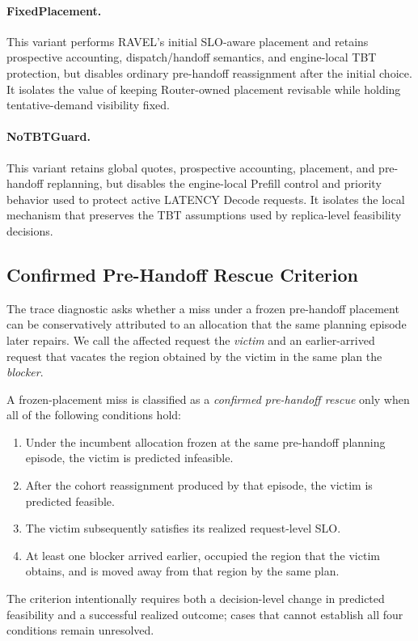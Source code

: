 \paragraph{FixedPlacement.}
This variant performs RAVEL's initial SLO-aware placement and retains
prospective accounting, dispatch/handoff semantics, and engine-local TBT
protection, but disables ordinary pre-handoff reassignment after the initial
choice.
It isolates the value of keeping Router-owned placement revisable while holding
tentative-demand visibility fixed.

\paragraph{NoTBTGuard.}
This variant retains global quotes, prospective accounting, placement, and
pre-handoff replanning, but disables the engine-local Prefill control and
priority behavior used to protect active LATENCY Decode requests.
It isolates the local mechanism that preserves the TBT assumptions used by
replica-level feasibility decisions.


\subsection{Confirmed Pre-Handoff Rescue Criterion}
\label{sec:appendix:rescue-criterion}

The trace diagnostic asks whether a miss under a frozen pre-handoff placement
can be conservatively attributed to an allocation that the same planning
episode later repairs.
We call the affected request the \emph{victim} and an earlier-arrived request
that vacates the region obtained by the victim in the same plan the
\emph{blocker}.

A frozen-placement miss is classified as a \emph{confirmed pre-handoff rescue}
only when all of the following conditions hold:
\begin{enumerate}
    \item Under the incumbent allocation frozen at the same pre-handoff planning
          episode, the victim is predicted infeasible.
    \item After the cohort reassignment produced by that episode, the victim is
          predicted feasible.
    \item The victim subsequently satisfies its realized request-level SLO.
    \item At least one blocker arrived earlier, occupied the region that the
          victim obtains, and is moved away from that region by the same plan.
\end{enumerate}
The criterion intentionally requires both a decision-level change in predicted
feasibility and a successful realized outcome; cases that cannot establish all
four conditions remain unresolved.

